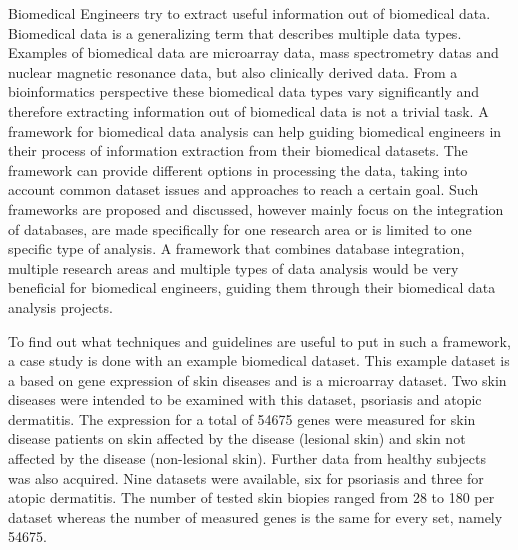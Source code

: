 \documentclass[10pt,a4paper]{article}
\begin{document}
	Biomedical Engineers try to extract useful information out of biomedical data. Biomedical data is a generalizing term that describes multiple data types\cite{gehlenborg2010visualization}. Examples of biomedical data are microarray data\cite{brazma2001minimum}, mass spectrometry datas\cite{cottrell1999probability, dettmer2007mass} and nuclear magnetic resonance data\cite{capitani2017nuclear}, but also clinically derived data\cite{liu2012data, sittig2008grand}. From a bioinformatics perspective these biomedical data types vary significantly\cite{gehlenborg2010visualization} and therefore extracting information out of biomedical data is not a trivial task. A framework for biomedical data analysis can help guiding biomedical engineers in their process of information extraction from their biomedical datasets. The framework can provide different options in processing the data, taking into account common dataset issues\cite{bertolazzi2008logic, piatetsky2003microarray,lommen2009metalign} and approaches to reach a certain goal\cite{holzinger2014knowledge, wilkins2009proteomics}. Such frameworks are proposed and discussed, however mainly focus on the integration of databases\cite{teodoro2009biomedical, doi:10.1093/nar/gkm1037}, are made specifically for one research area\cite{sturn2002genesis, karnovsky2011metscape, tabas2012genecodis3} or is limited to one specific type of analysis\cite{faul2007g}. A framework that combines database integration, multiple research areas and multiple types of data analysis would be very beneficial for biomedical engineers, guiding them through their biomedical data analysis projects.

	To find out what techniques and guidelines are useful to put in such a framework, a case study is done with an example biomedical dataset. This example dataset is a based on gene expression of skin diseases\cite{nair2009genome, suarez2012expanding, bigler2013cross, kim2016spectrum, yao2008type, suarez2011nonlesional, tintle2011reversal, gittler2012progressive} and is a microarray dataset. Two skin diseases were intended to be examined with this dataset, psoriasis and atopic dermatitis. The expression for a total of 54675 genes were measured for skin disease patients on skin affected by the disease (lesional skin) and skin not affected by the disease (non-lesional skin). Further data from healthy subjects was also acquired. Nine datasets were available, six for psoriasis\cite{nair2009genome, suarez2012expanding, bigler2013cross, kim2016spectrum, yao2008type} and three for atopic dermatitis\cite{suarez2011nonlesional, tintle2011reversal, gittler2012progressive}. The number of tested skin biopies ranged from 28 to 180 per dataset whereas the number of measured genes is the same for every set, namely 54675.
\end{document}
